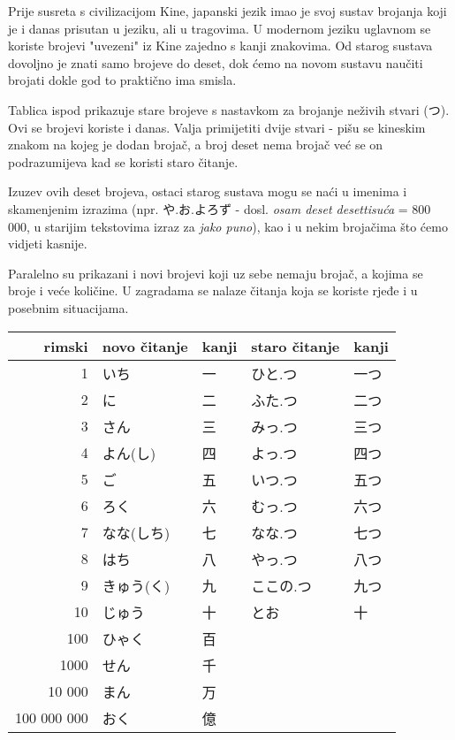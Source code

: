 
\usepackage{xcolor}
\author{Tomislav Mamić}

	
	Prije susreta s civilizacijom Kine, japanski jezik imao je svoj sustav brojanja koji je i danas prisutan u jeziku, ali u tragovima. U modernom jeziku uglavnom se koriste brojevi "uvezeni" iz Kine zajedno s kanji znakovima. Od starog sustava dovoljno je znati samo brojeve do deset, dok ćemo na novom sustavu naučiti brojati dokle god to praktično ima smisla.
	
	
	Tablica ispod prikazuje stare brojeve s nastavkom za brojanje neživih stvari (つ). Ovi se brojevi koriste i danas. Valja primijetiti dvije stvari - pišu se kineskim znakom na kojeg je dodan brojač, a broj deset nema brojač već se on podrazumijeva kad se koristi staro čitanje.

	Izuzev ovih deset brojeva, ostaci starog sustava mogu se naći u imenima i skamenjenim izrazima (npr. や.お.よろず - dosl. \textit{osam deset desettisuća} = 800 000, u starijim tekstovima izraz za \textit{jako puno}), kao i u nekim brojačima što ćemo vidjeti kasnije.
	
	Paralelno su prikazani i novi brojevi koji uz sebe nemaju brojač, a kojima se broje i veće količine. U zagradama se nalaze čitanja koja se koriste rjeđe i u posebnim situacijama.
	
	\vspace{5pt}
	\begin{table}[h]
		\centering
		\begin{tabular}{r l l l l}\toprule[2pt]
			rimski & novo čitanje & kanji & staro čitanje & kanji\\
			\midrule
			1			& いち & 一 & ひと.つ & 一つ \\
			2			& に & 二 & ふた.つ & 二つ \\
			3			& さん & 三 & みっ.つ & 三つ \\
			4			& よん(し) & 四 & よっ.つ & 四つ \\
			5			& ご & 五 & いつ.つ & 五つ \\
			6			& ろく & 六 & むっ.つ & 六つ \\
			7			& なな(しち) & 七 & なな.つ & 七つ \\
			8			& はち & 八 & やっ.つ & 八つ \\
			9			& きゅう(く) & 九 & ここの.つ & 九つ \\
			10			& じゅう & 十 & とお & 十 \\
			100			& ひゃく & 百 &  &  \\
			1000		& せん & 千 &  &  \\
			10 000		& まん & 万 &  &  \\
			100 000 000	& おく & 億 &  &  \\
			\bottomrule
		\end{tabular}
	\end{table}

